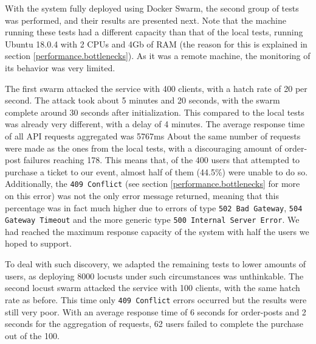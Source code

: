 \documentclass[12pt]{article}
\begin{document}





With the system fully deployed using Docker Swarm, the second group of tests was performed, and their results are presented next.
Note that the machine running these tests had a different capacity than that of the local tests, running Ubuntu 18.0.4 with 2 CPUs and 4Gb of RAM (the reason 
for this is explained in section \ref{performance.bottlenecks}).
As it was a remote machine, the monitoring of its behavior was very limited.

The first swarm attacked the service with 400 clients, with a hatch rate of 20 per second.
The attack took about 5 minutes and 20 seconds, with the swarm complete around 30 seconds after initialization.
This compared to the local tests was already very different, with a delay of 4 minutes.
The average response time of all API requests aggregated was 5767ms
About the same number of requests were made as the ones from the local tests, with a discouraging amount of order-post failures reaching 178.
This means that, of the 400 users that attempted to purchase a ticket to our event, almost half of them (44.5\%) were unable to do so.
Additionally, the \texttt{409 Conflict} (see section \ref{performance.bottlenecks} for more on this error) was not the only error message returned, meaning that 
this percentage was in fact much higher due to errors of type \texttt{502 Bad Gateway}, \texttt{504 Gateway Timeout} and the more generic type 
\texttt{500 Internal Server Error}.
We had reached the maximum response capacity of the system with half the users we hoped to support.

To deal with such discovery, we adapted the remaining tests to lower amounts of users, as deploying 8000 locusts under such circumstances was unthinkable.
The second locust swarm attacked the service with 100 clients, with the same hatch rate as before.
This time only \texttt{409 Conflict} errors occurred but the results were still very poor.
With an average response time of 6 seconds for order-posts and 2 seconds for the aggregation of requests, 62 users failed to complete the purchase out of the 100.
\end{document}
